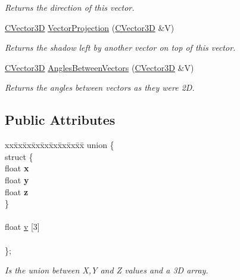 \begin{DoxyCompactItemize}
\begin{DoxyCompactList}\small\item\em Returns the direction of this vector. \end{DoxyCompactList}\item 
\hyperlink{struct_c_vector3_d}{C\+Vector3D} \hyperlink{struct_c_vector3_d_a0231ed3ed99a39b53642806a5132482b}{Vector\+Projection} (\hyperlink{struct_c_vector3_d}{C\+Vector3D} \&V)
\begin{DoxyCompactList}\small\item\em Returns the shadow left by another vector on top of this vector. \end{DoxyCompactList}\item 
\hyperlink{struct_c_vector3_d}{C\+Vector3D} \hyperlink{struct_c_vector3_d_a29e54962bcdad841c8d07a08c2457e83}{Angles\+Between\+Vectors} (\hyperlink{struct_c_vector3_d}{C\+Vector3D} \&V)
\begin{DoxyCompactList}\small\item\em Returns the angles between vectors as they were 2D. \end{DoxyCompactList}\end{DoxyCompactItemize}
\subsection*{Public Attributes}
\begin{DoxyCompactItemize}
\item 
\begin{tabbing}
xx\=xx\=xx\=xx\=xx\=xx\=xx\=xx\=xx\=\kill
union \{\\
\>struct \{\\
\>\>float {\bfseries x}\\
\>\>float {\bfseries y}\\
\>\>float {\bfseries z}\\
\>\} \hypertarget{union_c_vector3_d_1_1_0D24_a3098e1a1e086df425f1e7390792ca906}{}\label{union_c_vector3_d_1_1_0D24_a3098e1a1e086df425f1e7390792ca906}
\\
\>\>\\
\>float \hyperlink{struct_c_vector3_d_aa0d1d31315a7baec7d812af9e4512c89}{v} \mbox{[}3\mbox{]}\\
\>\>\\
\}; \hypertarget{struct_c_vector3_d_aee9bbbd45d1b083f517d995d9a836ecb}{}\label{struct_c_vector3_d_aee9bbbd45d1b083f517d995d9a836ecb}
\\

\end{tabbing}\begin{DoxyCompactList}\small\item\em Is the union between X,Y and Z values and a 3D array. \end{DoxyCompactList}\end{DoxyCompactItemize}


